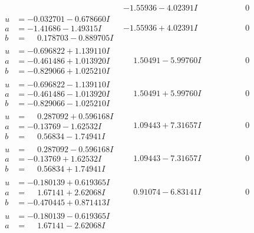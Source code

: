 \documentclass[1p]{elsarticle_modified}
\theoremstyle{definition}
\begin{document}
$$\begin{array}{c|c|c}
 & -1.55936 - 4.02391 I & \phantom{-0.000000 } 0 \\ \hline\begin{aligned}
u &= -0.032701 - 0.678660 I \\
a &= -1.41686 - 1.49315 I \\
b &= \phantom{-}0.178703 - 0.889705 I\end{aligned}
 & -1.55936 + 4.02391 I & \phantom{-0.000000 } 0 \\ \hline\begin{aligned}
u &= -0.696822 + 1.139110 I \\
a &= -0.461486 + 1.013920 I \\
b &= -0.829066 + 1.025210 I\end{aligned}
 & \phantom{-}1.50491 - 5.99760 I & \phantom{-0.000000 } 0 \\ \hline\begin{aligned}
u &= -0.696822 - 1.139110 I \\
a &= -0.461486 - 1.013920 I \\
b &= -0.829066 - 1.025210 I\end{aligned}
 & \phantom{-}1.50491 + 5.99760 I & \phantom{-0.000000 } 0 \\ \hline\begin{aligned}
u &= \phantom{-}0.287092 + 0.596168 I \\
a &= -0.13769 - 1.62532 I \\
b &= \phantom{-}0.56834 - 1.74941 I\end{aligned}
 & \phantom{-}1.09443 + 7.31657 I & \phantom{-0.000000 } 0 \\ \hline\begin{aligned}
u &= \phantom{-}0.287092 - 0.596168 I \\
a &= -0.13769 + 1.62532 I \\
b &= \phantom{-}0.56834 + 1.74941 I\end{aligned}
 & \phantom{-}1.09443 - 7.31657 I & \phantom{-0.000000 } 0 \\ \hline\begin{aligned}
u &= -0.180139 + 0.619365 I \\
a &= \phantom{-}1.67141 + 2.62068 I \\
b &= -0.470445 + 0.871413 I\end{aligned}
 & \phantom{-}0.91074 - 6.83141 I & \phantom{-0.000000 } 0 \\ \hline\begin{aligned}
u &= -0.180139 - 0.619365 I \\
a &= \phantom{-}1.67141 - 2.62068 I \\

\end{aligned}
\end{array}$$
\end{document}
